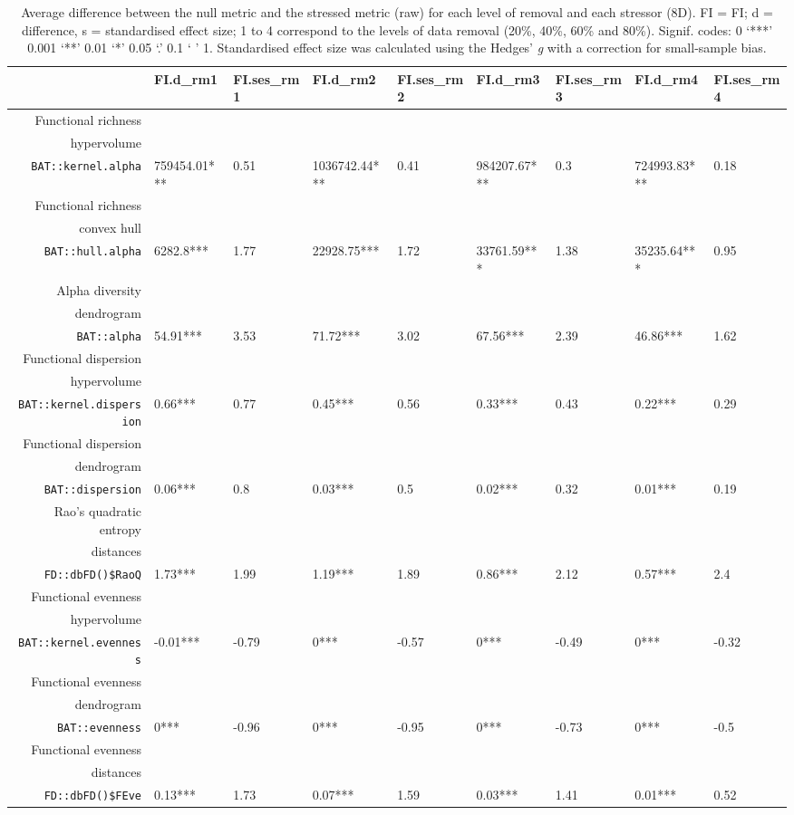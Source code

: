\begin{table}[ht]
\centering
\scriptsize
\begin{tabular}{rllllllll}
  \hline
 & FI.d\_rm1 & FI.ses\_rm1 & FI.d\_rm2 & FI.ses\_rm2 & FI.d\_rm3 & FI.ses\_rm3 & FI.d\_rm4 & FI.ses\_rm4 \\ 
  \hline
  Functional richness\\ hypervolume\\ \texttt{BAT::kernel.alpha} & 759454.01*** & 0.51 & 1036742.44*** & 0.41 & 984207.67*** & 0.3 & 724993.83*** & 0.18 \\ 
  Functional richness\\ convex hull\\ \texttt{BAT::hull.alpha} & 6282.8*** & 1.77 & 22928.75*** & 1.72 & 33761.59*** & 1.38 & 35235.64*** & 0.95 \\ 
  Alpha diversity\\ dendrogram\\ \texttt{BAT::alpha} & 54.91*** & 3.53 & 71.72*** & 3.02 & 67.56*** & 2.39 & 46.86*** & 1.62 \\ 
  Functional dispersion\\ hypervolume\\ \texttt{BAT::kernel.dispersion} & 0.66*** & 0.77 & 0.45*** & 0.56 & 0.33*** & 0.43 & 0.22*** & 0.29 \\ 
  Functional dispersion\\ dendrogram\\ \texttt{BAT::dispersion} & 0.06*** & 0.8 & 0.03*** & 0.5 & 0.02*** & 0.32 & 0.01*** & 0.19 \\ 
  Rao's quadratic entropy\\ distances\\ \texttt{FD::dbFD()\$RaoQ} & 1.73*** & 1.99 & 1.19*** & 1.89 & 0.86*** & 2.12 & 0.57*** & 2.4 \\ 
  Functional evenness\\ hypervolume\\ \texttt{BAT::kernel.evenness} & -0.01*** & -0.79 & 0*** & -0.57 & 0*** & -0.49 & 0*** & -0.32 \\ 
  Functional evenness\\ dendrogram\\ \texttt{BAT::evenness} & 0*** & -0.96 & 0*** & -0.95 & 0*** & -0.73 & 0*** & -0.5 \\ 
  Functional evenness\\ distances\\ \texttt{FD::dbFD()\$FEve} & 0.13*** & 1.73 & 0.07*** & 1.59 & 0.03*** & 1.41 & 0.01*** & 0.52 \\ 
   \hline
\end{tabular}
\caption{Average difference between the null metric and the stressed metric (raw) for each level of removal and each stressor (8D). FI = FI; d = difference, s = standardised effect size; 1 to 4 correspond to the levels of data removal (20\%, 40\%, 60\% and 80\%). Signif. codes:  0 ‘***’ 0.001 ‘**’ 0.01 ‘*’ 0.05 ‘.’ 0.1 ‘ ’ 1. Standardised effect size was calculated using the Hedges' \textit{g} with a correction for small-sample bias.} 
\end{table}
